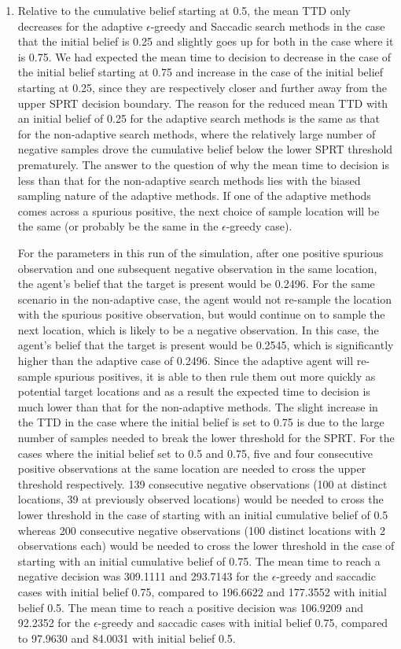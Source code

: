 \begin{enumerate}
    \item Relative to the cumulative belief starting at 0.5, the mean TTD only decreases for the adaptive $\epsilon$-greedy and Saccadic search methods in the case that the initial belief is 0.25 and slightly goes up for both in the case where it is 0.75. We had expected the mean time to decision to decrease in the case of the initial belief starting at 0.75 and increase in the case of the initial belief starting at 0.25, since they are respectively closer and further away from the upper SPRT decision boundary.
    The reason for the reduced mean TTD with an initial belief of 0.25 for the adaptive search methods is the same as that for the non-adaptive search methods, where the relatively large number of negative samples drove the cumulative belief below the lower SPRT threshold prematurely. The answer to the question of why the mean time to decision is less than that for the non-adaptive search methods lies with the biased sampling nature of the adaptive methods. If one of the adaptive methods comes across a spurious positive, the next choice of sample location will be the same (or probably be the same in the $\epsilon$-greedy case).
    \par For the parameters in this run of the simulation, after one positive spurious observation and one subsequent negative observation in the same location, the agent's belief that the target is present would be 0.2496. For the same scenario in the non-adaptive case, the agent would not re-sample the location with the spurious positive observation, but would continue on to sample the next location, which is likely to be a negative observation. In this case, the agent's belief that the target is present would be 0.2545, which is significantly higher than the adaptive case of 0.2496. Since the adaptive agent will re-sample spurious positives, it is able to then rule them out more quickly as potential target locations and as a result the expected time to decision is much lower than that for the non-adaptive methods. The slight increase in the TTD in the case where the initial belief is set to 0.75 is due to the large number of samples needed to break the lower threshold for the SPRT. For the cases where the initial belief set to 0.5 and 0.75, five and four consecutive positive observations at the same location are needed to cross the upper threshold respectively. 139 consecutive negative observations (100 at distinct locations, 39 at previously observed locations) would be needed to cross the lower threshold in the case of starting with an initial cumulative belief of 0.5 whereas 200 consecutive negative observations (100 distinct locations with 2 observations each) would be needed to cross the lower threshold in the case of starting with an initial cumulative belief of 0.75. The mean time to reach a negative decision was 309.1111 and 293.7143 for the $\epsilon$-greedy and saccadic cases with initial belief 0.75, compared to 196.6622 and 177.3552 with initial belief 0.5. The mean time to reach a positive decision was 106.9209 and 92.2352 for the $\epsilon$-greedy and saccadic cases with initial belief 0.75, compared to 97.9630 and 84.0031 with initial belief 0.5. 

\end{enumerate}
